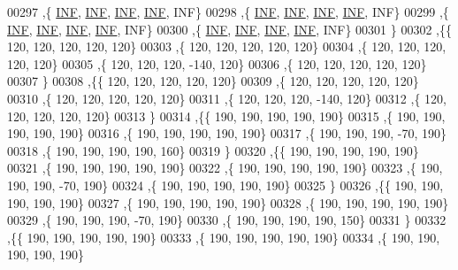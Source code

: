 \begin{DoxyCode}
00297   ,\{   \hyperlink{energy__const_8h_a12c2040f25d8e3a7b9e1c2024c618cb6}{INF},   \hyperlink{energy__const_8h_a12c2040f25d8e3a7b9e1c2024c618cb6}{INF},   \hyperlink{energy__const_8h_a12c2040f25d8e3a7b9e1c2024c618cb6}{INF},   \hyperlink{energy__const_8h_a12c2040f25d8e3a7b9e1c2024c618cb6}{INF},   INF\}
00298   ,\{   \hyperlink{energy__const_8h_a12c2040f25d8e3a7b9e1c2024c618cb6}{INF},   \hyperlink{energy__const_8h_a12c2040f25d8e3a7b9e1c2024c618cb6}{INF},   \hyperlink{energy__const_8h_a12c2040f25d8e3a7b9e1c2024c618cb6}{INF},   \hyperlink{energy__const_8h_a12c2040f25d8e3a7b9e1c2024c618cb6}{INF},   INF\}
00299   ,\{   \hyperlink{energy__const_8h_a12c2040f25d8e3a7b9e1c2024c618cb6}{INF},   \hyperlink{energy__const_8h_a12c2040f25d8e3a7b9e1c2024c618cb6}{INF},   \hyperlink{energy__const_8h_a12c2040f25d8e3a7b9e1c2024c618cb6}{INF},   \hyperlink{energy__const_8h_a12c2040f25d8e3a7b9e1c2024c618cb6}{INF},   INF\}
00300   ,\{   \hyperlink{energy__const_8h_a12c2040f25d8e3a7b9e1c2024c618cb6}{INF},   \hyperlink{energy__const_8h_a12c2040f25d8e3a7b9e1c2024c618cb6}{INF},   \hyperlink{energy__const_8h_a12c2040f25d8e3a7b9e1c2024c618cb6}{INF},   \hyperlink{energy__const_8h_a12c2040f25d8e3a7b9e1c2024c618cb6}{INF},   INF\}
00301   \}
00302  ,\{\{   120,   120,   120,   120,   120\}
00303   ,\{   120,   120,   120,   120,   120\}
00304   ,\{   120,   120,   120,   120,   120\}
00305   ,\{   120,   120,   120,  -140,   120\}
00306   ,\{   120,   120,   120,   120,   120\}
00307   \}
00308  ,\{\{   120,   120,   120,   120,   120\}
00309   ,\{   120,   120,   120,   120,   120\}
00310   ,\{   120,   120,   120,   120,   120\}
00311   ,\{   120,   120,   120,  -140,   120\}
00312   ,\{   120,   120,   120,   120,   120\}
00313   \}
00314  ,\{\{   190,   190,   190,   190,   190\}
00315   ,\{   190,   190,   190,   190,   190\}
00316   ,\{   190,   190,   190,   190,   190\}
00317   ,\{   190,   190,   190,   -70,   190\}
00318   ,\{   190,   190,   190,   190,   160\}
00319   \}
00320  ,\{\{   190,   190,   190,   190,   190\}
00321   ,\{   190,   190,   190,   190,   190\}
00322   ,\{   190,   190,   190,   190,   190\}
00323   ,\{   190,   190,   190,   -70,   190\}
00324   ,\{   190,   190,   190,   190,   190\}
00325   \}
00326  ,\{\{   190,   190,   190,   190,   190\}
00327   ,\{   190,   190,   190,   190,   190\}
00328   ,\{   190,   190,   190,   190,   190\}
00329   ,\{   190,   190,   190,   -70,   190\}
00330   ,\{   190,   190,   190,   190,   150\}
00331   \}
00332  ,\{\{   190,   190,   190,   190,   190\}
00333   ,\{   190,   190,   190,   190,   190\}
00334   ,\{   190,   190,   190,   190,   190\}

\end{DoxyCode}
